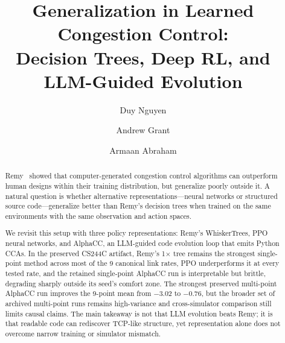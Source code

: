 \documentclass[sigconf,10pt]{acmart}
\begin{document}
\title{Generalization in Learned Congestion Control:\\Decision Trees, Deep RL, and LLM-Guided Evolution}

\author{Duy Nguyen}

\author{Andrew Grant}

\author{Armaan Abraham}

\renewcommand{\shortauthors}{Nguyen, Grant, Abraham}

\begin{abstract}
Remy~\cite{winstein2013tcp} showed that computer-generated congestion control
algorithms can outperform human designs within their training distribution, but
generalize poorly outside it. A natural question is whether alternative
representations---neural networks or structured source code---generalize
better than Remy's decision trees when trained on the same environments with
the same observation and action spaces.

We revisit this setup with three policy representations: Remy's WhiskerTrees,
PPO neural networks, and AlphaCC, an LLM-guided code evolution loop that emits
Python CCAs. In the preserved CS244C artifact, Remy's 1$\times$ tree remains
the strongest single-point method across most of the 9 canonical link rates,
PPO underperforms it at every tested rate, and the retained single-point
AlphaCC run is interpretable but brittle, degrading sharply outside its seed's
comfort zone. The strongest preserved multi-point AlphaCC run improves the
9-point mean from $-$3.02 to $-$0.76, but the broader set of archived
multi-point runs remains high-variance and cross-simulator comparison still
limits causal claims.
The main takeaway is not that LLM evolution beats Remy; it is that readable
code can rediscover TCP-like structure, yet representation alone does not
overcome narrow training or simulator mismatch.
\end{abstract}

\maketitle





\end{document}
